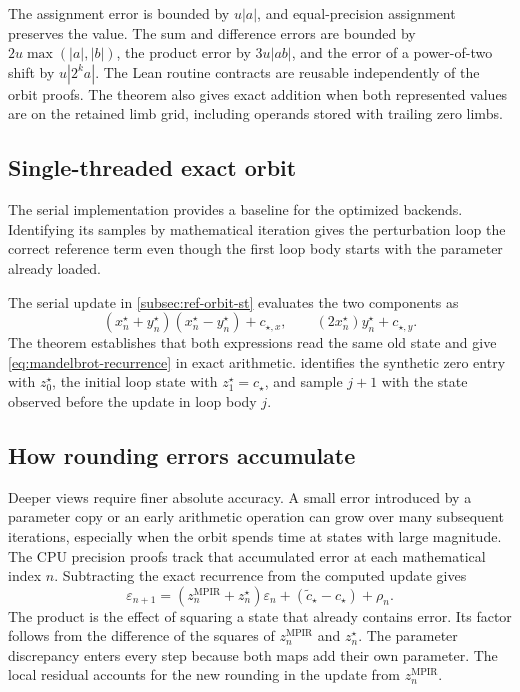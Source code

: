 The assignment error is bounded by $u|a|$, and equal-precision assignment
preserves the value. The sum and difference errors are bounded by
$2u\max(|a|,|b|)$, the product error by $3u|ab|$, and the error of a
power-of-two shift by $u|2^k a|$. The Lean routine contracts are reusable
independently of the orbit proofs.
The theorem  also gives exact addition
when both represented values are on the retained limb grid, including
operands stored with trailing zero limbs.

\subsection{Single-threaded exact orbit}
\label{subsec:reference-orbit-proof-st-exact}

The serial implementation provides a baseline for the optimized backends.
Identifying its samples by mathematical iteration gives the perturbation
loop the correct reference term even though the first loop body starts
with the parameter already loaded.

The serial update in \cref{subsec:ref-orbit-st} evaluates the two components as
\[
 (x_n^\star+y_n^\star)(x_n^\star-y_n^\star)+c_{\star,x},
 \qquad (2x_n^\star)y_n^\star+c_{\star,y}.
\]
The theorem  establishes that both
expressions read the same old state and give
\eqref{eq:mandelbrot-recurrence} in exact arithmetic.
 identifies the synthetic zero entry
with $z_0^\star$, the initial loop state with $z_1^\star=c_\star$, and
sample $j+1$ with the state observed before the update in loop body $j$.

\subsection{How rounding errors accumulate}
\label{subsec:reference-orbit-proof-propagation}

Deeper views require finer absolute accuracy. A small error introduced by
a parameter copy or an early arithmetic operation can grow over many
subsequent iterations, especially when the orbit spends time at states with
large magnitude. The CPU precision proofs track that accumulated error at
each mathematical index \(n\).
Subtracting the exact recurrence from the computed update gives
\begin{equation}
  \varepsilon_{n+1}
  = (z_n^{\mathrm{MPIR}}+z_n^\star)\varepsilon_n
      +(\widetilde c_\star-c_\star)+\rho_n.
  \label{eq:reference-orbit-proof-error-identity}
\end{equation}
The product is the effect of squaring a state that already contains error.
Its factor follows from the difference of the squares of
\(z_n^{\mathrm{MPIR}}\) and \(z_n^\star\).
The parameter discrepancy enters every step because both maps add their own
parameter. The local residual accounts for the new rounding in the update
from \(z_n^{\mathrm{MPIR}}\).

